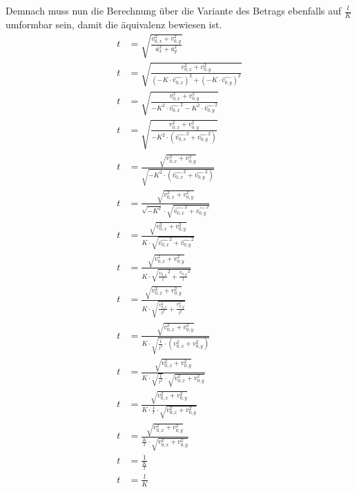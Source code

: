 Demnach muss nun die Berechnung über die Variante des Betrags ebenfalls auf $\frac{l}{K}$ umformbar sein, damit
die äquivalenz bewiesen ist.
\begin{align}
    t &= \sqrt{\frac{v_{0,x}^2 + v_{0,y}^2}{a_x^2 + a_y^2}}\\
    t &= \sqrt{\frac{v_{0,x}^2 + v_{0,y}^2}{(-K \cdot \hat{v_{0,x}})^2 + (-K \cdot \hat{v_{0,y}})^2}}\\
    t &= \sqrt{\frac{v_{0,x}^2 + v_{0,y}^2}{-K^2 \cdot \hat{v_{0,x}}^2 -K^2 \cdot \hat{v_{0,y}}^2}}\\
    t &= \sqrt{\frac{v_{0,x}^2 + v_{0,y}^2}{-K^2 \cdot (\hat{v_{0,x}}^2 + \hat{v_{0,y}}^2)}}\\
    t &= \frac{\sqrt{v_{0,x}^2 + v_{0,y}^2}}{\sqrt{-K^2 \cdot (\hat{v_{0,x}}^2 + \hat{v_{0,y}}^2)}}\\
    t &= \frac{\sqrt{v_{0,x}^2 + v_{0,y}^2}}{\sqrt{-K^2} \cdot \sqrt{\hat{v_{0,x}}^2 + \hat{v_{0,y}}^2}}\\
    t &= \frac{\sqrt{v_{0,x}^2 + v_{0,y}^2}}{K \cdot \sqrt{\hat{v_{0,x}}^2 + \hat{v_{0,y}}^2}}\\
    t &= \frac{\sqrt{v_{0,x}^2 + v_{0,y}^2}}{K \cdot \sqrt{\frac{v_{0,x}}{l}^2 + \frac{v_{0,y}}{l}^2}}\\
    t &= \frac{\sqrt{v_{0,x}^2 + v_{0,y}^2}}{K \cdot \sqrt{\frac{v_{0,x}^2}{l^2} + \frac{v_{0,y}^2}{l^2}}}\\
    t &= \frac{\sqrt{v_{0,x}^2 + v_{0,y}^2}}{K \cdot \sqrt{\frac{1}{l^2} \cdot (v_{0,x}^2 + v_{0,y}^2)}}\\
    t &= \frac{\sqrt{v_{0,x}^2 + v_{0,y}^2}}{K \cdot \sqrt{\frac{1}{l^2}} \cdot \sqrt{v_{0,x}^2 + v_{0,y}^2}}\\
    t &= \frac{\sqrt{v_{0,x}^2 + v_{0,y}^2}}{K \cdot \frac{1}{l} \cdot \sqrt{v_{0,x}^2 + v_{0,y}^2}}\\
    t &= \frac{\sqrt{v_{0,x}^2 + v_{0,y}^2}}{\frac{K}{l} \cdot \sqrt{v_{0,x}^2 + v_{0,y}^2}}\\
    t &= \frac{1}{\frac{K}{l}}\\
    t &= \frac{l}{K}
\end{align}
